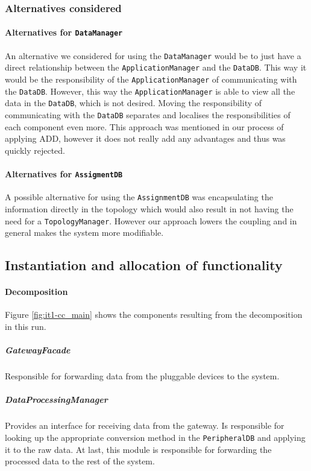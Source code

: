 \documentclass[english]{sareport}
\begin{document}
\subsubsection*{Alternatives considered}
\paragraph{Alternatives for \texttt{DataManager}}
An alternative we considered for using the \texttt{DataManager} would be to just have a direct relationship between the \texttt{ApplicationManager} and the \texttt{DataDB}. This way it would be the responsibility of the \texttt{ApplicationManager} of communicating with the \texttt{DataDB}. However, this way the \texttt{ApplicationManager} is able to view all the data in the \texttt{DataDB}, which is not desired. Moving the responsibility of communicating with the \texttt{DataDB} separates and localises the responsibilities of each component even more. This approach was mentioned in our process of applying ADD, however it does not really add any advantages and thus was quickly rejected.
	
\paragraph{Alternatives for \texttt{AssigmentDB}}
A possible alternative for using the \texttt{AssignmentDB} was encapsulating the information directly in the topology which would also result in not having the need for a \texttt{TopologyManager}. However our approach lowers the coupling and in general makes the system more modifiable.

\subsection{Instantiation and allocation of functionality}
\paragraph{Decomposition}
Figure \ref{fig:it1-cc_main} shows the components resulting from the decomposition in this run. 


\subparagraph{GatewayFacade}
Responsible for forwarding data from the pluggable devices to the system.

\subparagraph{DataProcessingManager}
Provides an interface for receiving data from the gateway. Is responsible for looking up the appropriate conversion method in the \texttt{PeripheralDB} and applying it to the raw data. At last, this module is responsible for forwarding the processed data to the rest of the system.
\end{document}
